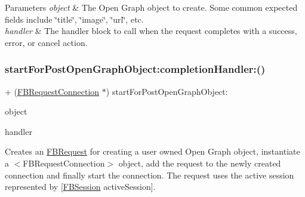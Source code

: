 \begin{DoxyParams}{Parameters}
{\em object} & The Open Graph object to create. Some common expected fields include \char`\"{}title\char`\"{}, \char`\"{}image\char`\"{}, \char`\"{}url\char`\"{}, etc.\\
\hline
{\em handler} & The handler block to call when the request completes with a success, error, or cancel action. \\
\hline
\end{DoxyParams}
\mbox{\label{interfaceFBRequestConnection_aa592bef80bf5a2450be91fc9538b65bd}} 
\subsubsection{\texorpdfstring{start\+For\+Post\+Open\+Graph\+Object\+:completion\+Handler\+:()}{startForPostOpenGraphObject:completionHandler:()}\hspace{0.1cm}{\footnotesize\ttfamily [4/5]}}
{\footnotesize\ttfamily + (\hyperlink{interfaceFBRequestConnection}{F\+B\+Request\+Connection} $\ast$) start\+For\+Post\+Open\+Graph\+Object\+: \begin{DoxyParamCaption}\item[{(id$<$ \hyperlink{protocolFBOpenGraphObject-p}{F\+B\+Open\+Graph\+Object} $>$)}]{object }\item[{completionHandler:(F\+B\+Request\+Handler)}]{handler }\end{DoxyParamCaption}}

Creates an {\ttfamily \hyperlink{interfaceFBRequest}{F\+B\+Request}} for creating a user owned Open Graph object, instantiate a $<$\+F\+B\+Request\+Connection$>$ object, add the request to the newly created connection and finally start the connection. The request uses the active session represented by {\ttfamily \mbox{[}\hyperlink{interfaceFBSession}{F\+B\+Session} active\+Session\mbox{]}}.


